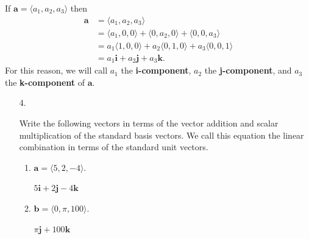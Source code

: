 \documentclass[12pt]{exam}
\begin{document}
  If $\mathbf{a}=\langle a_{1},a_{2},a_{3}\rangle$ then
  \begin{align*}
    \mathbf{a} & = \langle a_{1},a_{2},a_{3}\rangle \\
    & = \langle a_{1},0,0\rangle+\langle 0,a_{2},0\rangle+\langle 0,0,a_{3}\rangle \\
    & = a_{1}\langle 1,0,0\rangle+a_{2}\langle 0,1,0\rangle+a_{3}\langle 0,0,1\rangle \\
    & = a_{1}\mathbf{i}+a_{2}\mathbf{j}+a_{3}\mathbf{k}.
  \end{align*}
  For this reason, we will call $a_{1}$ the \textbf{i-component}, $a_{2}$ the \textbf{j-component}, and $a_{3}$ the \textbf{k-component} of $\mathbf{a}$.
  
  \begin{enumerate}
    \item[4.]{
      Write the following vectors in terms of the vector addition and scalar multiplication of the standard basis vectors.
      We call this equation the linear combination in terms of the standard unit vectors.
      \begin{enumerate}
        \item{
          $\mathbf{a}=\langle 5,2,-4\rangle$.
        }
        \begin{solution}
            \(5\bm{i}+2\bm{j}-4\bm{k}\)
        \end{solution}
        \item{
          $\mathbf{b}=\langle 0,\pi,100\rangle$.
        }
        \begin{solution}
            \(\pi\bm{j}+100\bm{k}\)
        \end{solution}
      \end{enumerate}
    }
  \end{enumerate}
  
\end{document}
